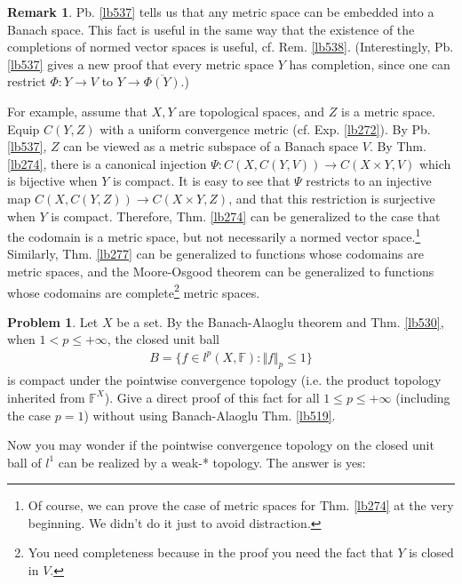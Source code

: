 \documentclass[12pt,b5paper,notitlepage]{article}
\theoremstyle{definition}
\newtheorem{rem}[df]{Remark}
\newtheorem{prob}{\color{red}Problem}[section]
\theoremstyle{plain}
\newcommand{\ovl}{\overline}
\newcommand{\Fbb}{\mathbb F}
\numberwithin{equation}{section}
\begin{document}
\begin{rem}
Pb. \ref{lb537} tells us that any metric space can be embedded into a Banach space. This fact is useful in the same way that the existence of the completions of normed vector spaces is useful, cf. Rem. \ref{lb538}. (Interestingly, Pb. \ref{lb537} gives a new proof that every metric space $Y$ has completion, since one can restrict $\Phi:Y\rightarrow V$ to $Y\rightarrow\ovl{\Phi(Y)}$.) 

For example, assume that $X,Y$ are topological spaces, and $Z$ is a metric space. Equip $C(Y,Z)$ with a uniform convergence metric (cf. Exp. \ref{lb272}). By Pb. \ref{lb537}, $Z$ can be viewed as a metric subspace of a Banach space $V$. By Thm. \ref{lb274}, there is a canonical injection $\Psi:C(X,C(Y,V))\rightarrow C(X\times Y,V)$ which is bijective when $Y$ is compact. It is easy to see that $\Psi$ restricts to an injective map $C(X,C(Y,Z))\rightarrow C(X\times Y,Z)$, and that this restriction is surjective when $Y$ is compact. Therefore, Thm. \ref{lb274} can be generalized to the case that the codomain is a metric space, but not necessarily a normed vector space.\footnote{Of course, we can prove the case of metric spaces for Thm. \ref{lb274} at the very beginning. We didn't do it just to avoid distraction.} Similarly, Thm. \ref{lb277} can be generalized to functions whose codomains are metric spaces, and the Moore-Osgood theorem can be generalized to functions whose codomains are complete\footnote{You need completeness because in the proof you need the fact that $Y$ is closed in $V$.} metric spaces.   \hfill\qedsymbol
\end{rem}








\begin{prob}\label{lb531}
Let $X$ be a set. By the Banach-Alaoglu theorem and Thm. \ref{lb530}, when $1< p\leq +\infty$, the closed unit ball
\begin{align}
B=\{f\in l^p(X,\Fbb):\Vert f\Vert_p\leq 1\}
\end{align}
is compact under the pointwise convergence topology (i.e. the product topology inherited from $\Fbb^X$). Give a direct proof of this fact for all $1\leq p\leq +\infty$ (including the case $p=1$) without using Banach-Alaoglu Thm. \ref{lb519}.
\end{prob}


Now you may wonder if the pointwise convergence topology on the closed unit ball of $l^1$ can be realized by a weak-* topology. The answer is yes:
\end{document}

